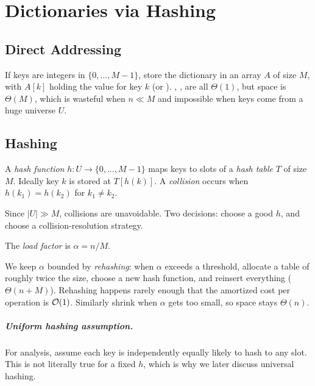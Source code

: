 \chapter{Dictionaries via Hashing}


\section{Direct Addressing}

If keys are integers in $\{0, \ldots, M-1\}$, store the dictionary in an array
$A$ of size $M$, with $A[k]$ holding the value for key $k$ (or ).
, ,  are all $\Theta(1)$, but space is
$\Theta(M)$, which is wasteful when $n \ll M$ and impossible when keys come from a
huge universe $U$.

\section{Hashing}

\begin{definition}
A \emph{hash function} $h : U \to \{0, \ldots, M-1\}$ maps keys to slots of a
\emph{hash table} $T$ of size $M$. Ideally key $k$ is stored at $T[h(k)]$. A
\emph{collision} occurs when $h(k_1) = h(k_2)$ for $k_1 \ne k_2$.
\end{definition}

Since $|U| \gg M$, collisions are unavoidable. Two decisions: choose a good $h$,
and choose a collision-resolution strategy.

\begin{definition}
The \emph{load factor} is $\alpha = n / M$.
\end{definition}

We keep $\alpha$ bounded by \emph{rehashing}: when $\alpha$ exceeds a threshold,
allocate a table of roughly twice the size, choose a new hash function, and
reinsert everything ($\Theta(n + M)$). Rehashing happens rarely enough that the
amortized cost per operation is $\mathcal{O}(1)$. Similarly shrink when $\alpha$ gets too
small, so space stays $\Theta(n)$.

\paragraph{Uniform hashing assumption.} For analysis, assume each key is
independently equally likely to hash to any slot. This is not literally true
for a fixed $h$, which is why we later discuss universal hashing.


